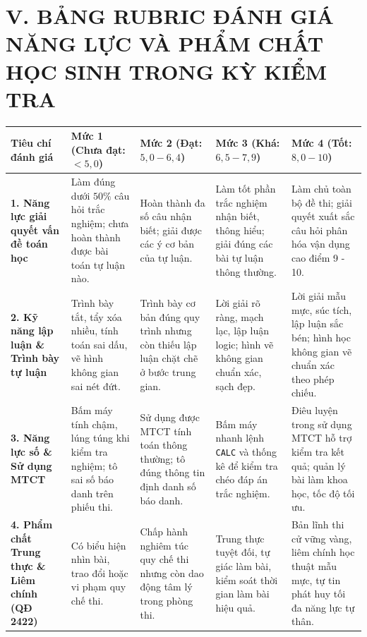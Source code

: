 \documentclass[12pt, a4paper]{article}
\begin{document}
\vspace{5pt}

\section*{V. BẢNG RUBRIC ĐÁNH GIÁ NĂNG LỰC VÀ PHẨM CHẤT HỌC SINH TRONG KỲ KIỂM TRA}

\begin{center}
\renewcommand{\arraystretch}{1.25}
\begin{tabularx}{\textwidth}{|p{2.8cm}|X|X|X|X|}
    \hline
    \textbf{Tiêu chí đánh giá} & \textbf{Mức 1 (Chưa đạt: $< 5{,}0$)} & \textbf{Mức 2 (Đạt: $5{,}0 - 6{,}4$)} & \textbf{Mức 3 (Khá: $6{,}5 - 7{,}9$)} & \textbf{Mức 4 (Tốt: $8{,}0 - 10$)} \\ \hline
    \textbf{1. Năng lực giải quyết vấn đề toán học} & Làm đúng dưới $50\%$ câu hỏi trắc nghiệm; chưa hoàn thành được bài toán tự luận nào. & Hoàn thành đa số câu nhận biết; giải được các ý cơ bản của tự luận. & Làm tốt phần trắc nghiệm nhận biết, thông hiểu; giải đúng các bài tự luận thông thường. & Làm chủ toàn bộ đề thi; giải quyết xuất sắc câu hỏi phân hóa vận dụng cao điểm 9 - 10. \\ \hline
    \textbf{2. Kỹ năng lập luận \& Trình bày tự luận} & Trình bày tắt, tẩy xóa nhiều, tính toán sai dấu, vẽ hình không gian sai nét đứt. & Trình bày cơ bản đúng quy trình nhưng còn thiếu lập luận chặt chẽ ở bước trung gian. & Lời giải rõ ràng, mạch lạc, lập luận logic; hình vẽ không gian chuẩn xác, sạch đẹp. & Lời giải mẫu mực, súc tích, lập luận sắc bén; hình học không gian vẽ chuẩn xác theo phép chiếu. \\ \hline
    \textbf{3. Năng lực số \& Sử dụng MTCT} & Bấm máy tính chậm, lúng túng khi kiểm tra nghiệm; tô sai số báo danh trên phiếu thi. & Sử dụng được MTCT tính toán thông thường; tô đúng thông tin định danh số báo danh. & Bấm máy nhanh lệnh \texttt{CALC} và thống kê để kiểm tra chéo đáp án trắc nghiệm. & Điêu luyện trong sử dụng MTCT hỗ trợ kiểm tra kết quả; quản lý bài làm khoa học, tốc độ tối ưu. \\ \hline
    \textbf{4. Phẩm chất Trung thực \& Liêm chính (QĐ 2422)} & Có biểu hiện nhìn bài, trao đổi hoặc vi phạm quy chế thi. & Chấp hành nghiêm túc quy chế thi nhưng còn dao động tâm lý trong phòng thi. & Trung thực tuyệt đối, tự giác làm bài, kiểm soát thời gian làm bài hiệu quả. & Bản lĩnh thi cử vững vàng, liêm chính học thuật mẫu mực, tự tin phát huy tối đa năng lực tự thân. \\ \hline
\end{tabularx}
\end{center}
\end{document}
